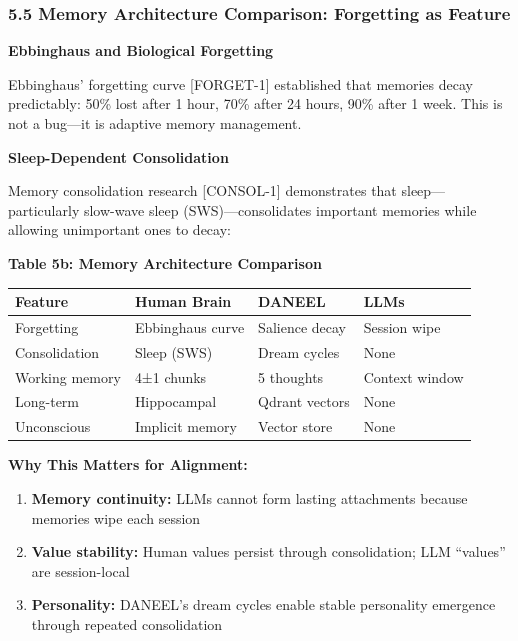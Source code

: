 \documentclass[
  11pt,
]{article}
\newcounter{none} %
\providecommand{\tightlist}{%
  \setlength{\itemsep}{0pt}\setlength{\parskip}{0pt}}
\begin{document}
\subsubsection{5.5 Memory Architecture Comparison: Forgetting as
Feature}\label{memory-architecture-comparison-forgetting-as-feature}

\textbf{Ebbinghaus and Biological Forgetting}

Ebbinghaus' forgetting curve {[}FORGET-1{]} established that memories
decay predictably: 50\% lost after 1 hour, 70\% after 24 hours, 90\%
after 1 week. This is not a bug---it is adaptive memory management.

\textbf{Sleep-Dependent Consolidation}

Memory consolidation research {[}CONSOL-1{]} demonstrates that
sleep---particularly slow-wave sleep (SWS)---consolidates important
memories while allowing unimportant ones to decay:

\textbf{Table 5b: Memory Architecture Comparison}

{\def\LTcaptype{none} %
\begin{longtable}[]{@{}llll@{}}
\toprule\noalign{}
Feature & Human Brain & DANEEL & LLMs \\
\midrule\noalign{}
\endhead
\bottomrule\noalign{}
\endlastfoot
Forgetting & Ebbinghaus curve & Salience decay & Session wipe \\
Consolidation & Sleep (SWS) & Dream cycles & None \\
Working memory & 4±1 chunks & 5 thoughts & Context window \\
Long-term & Hippocampal & Qdrant vectors & None \\
Unconscious & Implicit memory & Vector store & None \\
\end{longtable}
}

\textbf{Why This Matters for Alignment:}

\begin{enumerate}
\def\labelenumi{\arabic{enumi}.}
\tightlist
\item
  \textbf{Memory continuity:} LLMs cannot form lasting attachments
  because memories wipe each session
\item
  \textbf{Value stability:} Human values persist through consolidation;
  LLM ``values'' are session-local
\item
  \textbf{Personality:} DANEEL's dream cycles enable stable personality
  emergence through repeated consolidation
\end{enumerate}
\end{document}
